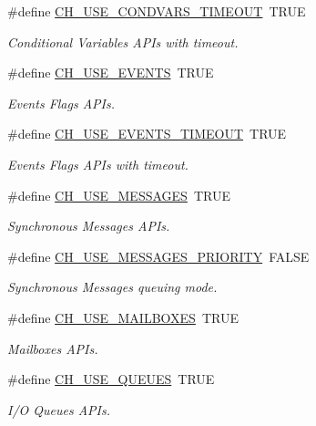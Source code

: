 \begin{DoxyCompactItemize}
\#define \hyperlink{group__config_gaccc2c032c409bced696f75877e270979}{C\+H\+\_\+\+U\+S\+E\+\_\+\+C\+O\+N\+D\+V\+A\+R\+S\+\_\+\+T\+I\+M\+E\+O\+U\+T}~T\+R\+U\+E
\begin{DoxyCompactList}\small\item\em Conditional Variables A\+P\+Is with timeout. \end{DoxyCompactList}\item 
\#define \hyperlink{group__config_ga5e3ac686cd33ad40a89aaaf97b3dc781}{C\+H\+\_\+\+U\+S\+E\+\_\+\+E\+V\+E\+N\+T\+S}~T\+R\+U\+E
\begin{DoxyCompactList}\small\item\em Events Flags A\+P\+Is. \end{DoxyCompactList}\item 
\#define \hyperlink{group__config_ga64a6ad752750f42fe2474d3e7f191a71}{C\+H\+\_\+\+U\+S\+E\+\_\+\+E\+V\+E\+N\+T\+S\+\_\+\+T\+I\+M\+E\+O\+U\+T}~T\+R\+U\+E
\begin{DoxyCompactList}\small\item\em Events Flags A\+P\+Is with timeout. \end{DoxyCompactList}\item 
\#define \hyperlink{group__config_ga3823e336736d522bbfaf780c86746482}{C\+H\+\_\+\+U\+S\+E\+\_\+\+M\+E\+S\+S\+A\+G\+E\+S}~T\+R\+U\+E
\begin{DoxyCompactList}\small\item\em Synchronous Messages A\+P\+Is. \end{DoxyCompactList}\item 
\#define \hyperlink{group__config_gaf48947f33ed7a44a7701d84d83d94a1c}{C\+H\+\_\+\+U\+S\+E\+\_\+\+M\+E\+S\+S\+A\+G\+E\+S\+\_\+\+P\+R\+I\+O\+R\+I\+T\+Y}~F\+A\+L\+S\+E
\begin{DoxyCompactList}\small\item\em Synchronous Messages queuing mode. \end{DoxyCompactList}\item 
\#define \hyperlink{group__config_ga6cf1736db681617019f96c4c209d2716}{C\+H\+\_\+\+U\+S\+E\+\_\+\+M\+A\+I\+L\+B\+O\+X\+E\+S}~T\+R\+U\+E
\begin{DoxyCompactList}\small\item\em Mailboxes A\+P\+Is. \end{DoxyCompactList}\item 
\#define \hyperlink{group__config_gaabe4bd52d2fd1b180ebba1d1e8243051}{C\+H\+\_\+\+U\+S\+E\+\_\+\+Q\+U\+E\+U\+E\+S}~T\+R\+U\+E
\begin{DoxyCompactList}\small\item\em I/\+O Queues A\+P\+Is. \end{DoxyCompactList}\item 

\end{DoxyCompactItemize}
